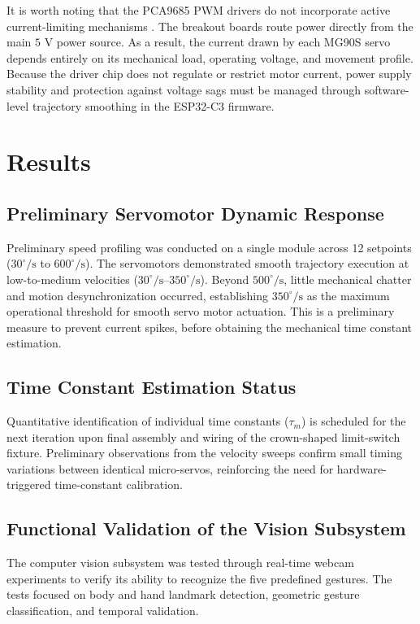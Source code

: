 \documentclass[lettersize,journal]{IEEEtran}
\begin{document}
	It is worth noting that the PCA9685 PWM drivers do not incorporate active current-limiting mechanisms \cite{pca9685}. The breakout boards route power directly from the main $5\text{ V}$ power source. As a result, the current drawn by each MG90S servo depends entirely on its mechanical load, operating voltage, and movement profile. Because the driver chip does not regulate or restrict motor current, power supply stability and protection against voltage sags must be managed through software-level trajectory smoothing in the ESP32-C3 firmware.
	
	\section{Results}
	\label{sec:results}
	
	\subsection{Preliminary Servomotor Dynamic Response}
	Preliminary speed profiling was conducted on a single module across 12 setpoints ($30^\circ/\text{s}$ to $600^\circ/\text{s}$). The servomotors demonstrated smooth trajectory execution at low-to-medium velocities ($30^\circ/\text{s}$--$350^\circ/\text{s}$). Beyond $500^\circ/\text{s}$, little mechanical chatter and motion desynchronization occurred, establishing $350^\circ/\text{s}$ as the maximum operational threshold for smooth servo motor actuation. This is a preliminary measure to prevent current spikes, before obtaining the mechanical time constant estimation.
	
	\subsection{Time Constant Estimation Status}
	Quantitative identification of individual time constants ($\tau_m$) is scheduled for the next iteration upon final assembly and wiring of the crown-shaped limit-switch fixture. Preliminary observations from the velocity sweeps confirm small timing variations between identical micro-servos, reinforcing the need for hardware-triggered time-constant calibration.
	
	\subsection{Functional Validation of the Vision Subsystem}
	
	The computer vision subsystem was tested through real-time webcam experiments to verify its ability to recognize the five predefined gestures. The tests focused on body and hand landmark detection, geometric gesture classification, and temporal validation.
	
\end{document}
